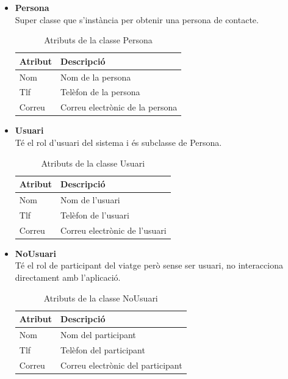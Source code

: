
\begin{itemize}

\item[]\textbf{Persona}\\
Super classe que s'instància per obtenir una persona de contacte.
\begin{table}[!h]
\centering
\begin{tabular}{|M|T|}
\hline
\textbf{Atribut}  & \textbf{Descripció} \\\hline
Nom &  Nom de la persona\\\hline
Tlf &  Telèfon de la persona\\\hline
Correu &  Correu electrònic de la persona\\\hline
\end{tabular}
\label{}
\caption{Atributs de la classe Persona}
\end{table}

\item[]\textbf{Usuari}\\
Té el rol d'usuari del sistema i és subclasse de Persona.
\begin{table}[!h]
\centering
\begin{tabular}{|M|T|}
\hline
\textbf{Atribut}  & \textbf{Descripció} \\\hline
Nom &  Nom de l'usuari\\\hline
Tlf &  Telèfon de l'usuari\\\hline
Correu &  Correu electrònic de l'usuari\\\hline
\end{tabular}
\label{}
\caption{Atributs de la classe Usuari}
\end{table}

\item[]\textbf{NoUsuari}\\
Té el rol de participant del viatge però sense ser usuari, no interacciona directament amb l'aplicació.

\begin{table}[!h]
\centering
\begin{tabular}{|M|T|}
\hline
\textbf{Atribut}  & \textbf{Descripció} \\\hline
Nom &  Nom del participant\\\hline
Tlf &  Telèfon del participant\\\hline
Correu &  Correu electrònic del participant\\\hline
\end{tabular}
\label{}
\caption{Atributs de la classe NoUsuari}
\end{table}


\end{itemize}
